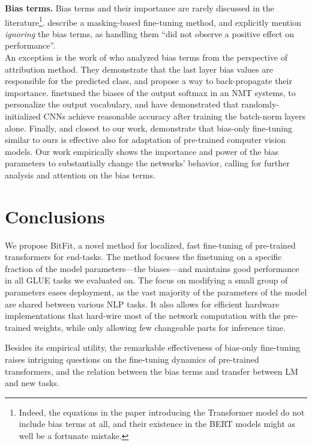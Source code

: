 \textbf{Bias terms.}\quad
Bias terms and their importance are rarely discussed in the literature\footnote{Indeed, the equations in the paper introducing the Transformer model \cite{DBLP:journals/corr/VaswaniSPUJGKP17} do not include bias terms at all, and their existence in the BERT models might as well be a fortunate mistake.}. \citet{zhao-etal-2020-masking} describe a masking-based fine-tuning method, and explicitly mention \emph{ignoring} the bias terms, as handling them ``did not observe a positive effect on performance''.\\
\indent An exception is the work of \citet{DBLP:conf/icml/WangZB19} who analyzed bias terms from the perspective of attribution method. They demonstrate that the last layer bias values are responsible for the predicted class, and propose a way to back-propagate their importance. \citet{DBLP:conf/acl/MichelN18} finetuned the biases of the output softmax in an NMT systems, to personalize the output vocabulary, and \citet{DBLP:journals/corr/abs-2003-00152}  have demonstrated that randomly-initialized CNNs achieve reasonable accuracy after training the batch-norm layers alone. Finally, and closest to our work, \citet{tinytl} demonstrate that bias-only fine-tuning similar to ours is effective also for adaptation of pre-trained computer vision models. Our work empirically shows the importance and power of the bias parameters to substantially change the networks' behavior, calling for further analysis and attention on the bias terms.

\section{Conclusions}

We propose BitFit, a novel method for localized, fast fine-tuning of pre-trained transformers for end-tasks. The method focuses the finetuning on a specific fraction of the model parameters---the biases---and maintains good performance in all GLUE tasks we evaluated on. The focus on modifying a small group of parameters eases deployment, as the vast majority of the parameters of the model are shared between various NLP tasks. It also allows for efficient hardware implementations that hard-wire most of the network computation with the pre-trained weights, while only allowing few changeable parts for inference time.

Besides its empirical utility, the remarkable effectiveness of bias-only fine-tuning raises intriguing questions on the fine-tuning dynamics of pre-trained transformers, and the relation between the bias terms and transfer between LM and new tasks. 


